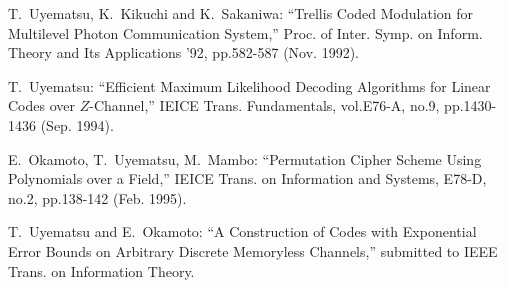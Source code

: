 \begin{publication}
\item 
T.~Uyematsu, K.~Kikuchi and K.~Sakaniwa:
 ``Trellis Coded Modulation for Multilevel Photon Communication System,''
 Proc. of Inter. Symp. on Inform. Theory and Its Applications '92,
 pp.582-587 (Nov. 1992).

\item
T.~Uyematsu:
 ``Efficient Maximum Likelihood Decoding Algorithms for Linear Codes
 over $Z$-Channel,'' IEICE Trans. Fundamentals, 
 vol.E76-A, no.9, pp.1430-1436 (Sep. 1994).

\item
E.~Okamoto, T.~Uyematsu, M.~Mambo:
 ``Permutation Cipher Scheme Using Polynomials over a Field,''
 IEICE Trans. on Information and Systems, E78-D, no.2, pp.138-142 (Feb. 1995).

\item 
T.~Uyematsu and E.~Okamoto:
 ``A Construction of Codes with Exponential Error Bounds
 on Arbitrary Discrete Memoryless Channels,''
 submitted to IEEE Trans. on Information Theory.

\end{publication}
